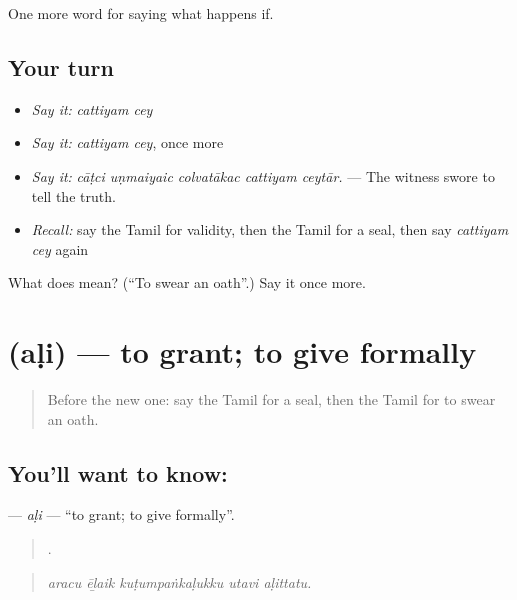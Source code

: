 \begin{grammarlens}[title={What you've built}]
One more word for saying what happens if.
\end{grammarlens}

\subsection*{Your turn}
\begin{itemize}
\raggedright
  \item \emph{Say it:} \emph{cattiyam cey}
  \item \emph{Say it:} \emph{cattiyam cey}, once more
  \item \emph{Say it:} \emph{cāṭci uṇmaiyaic colvatākac cattiyam ceytār.} — The witness swore to tell the truth.
  \item \emph{Recall:} say the Tamil for validity, then the Tamil for a seal, then say \emph{cattiyam cey} again
\end{itemize}

\begin{tcolorbox}[breakable,colback=teal!4,colframe=teal!35!black,title={Before you move on}]
What does   mean? (\textquotedblleft{}To swear an oath\textquotedblright{}.) Say it once more.
\end{tcolorbox}
\section[\texorpdfstring{\ta{அளி} (aḷi)}{அளி (aḷi)}]{ (aḷi) — to grant; to give formally}

\label{lesson:TA-C542-ali-grant}



\begin{quote}
Before the new one: say the Tamil for a seal, then the Tamil for to swear an oath.
\end{quote}

\subsection*{You'll want to know: }
\textbf{} — \emph{aḷi} — \textquotedblleft{}to grant; to give formally\textquotedblright{}.

\begin{quote}
    .
\end{quote}

\begin{quote}
\emph{aracu ēḻaik kuṭumpaṅkaḷukku utavi aḷittatu.}
\end{quote}

